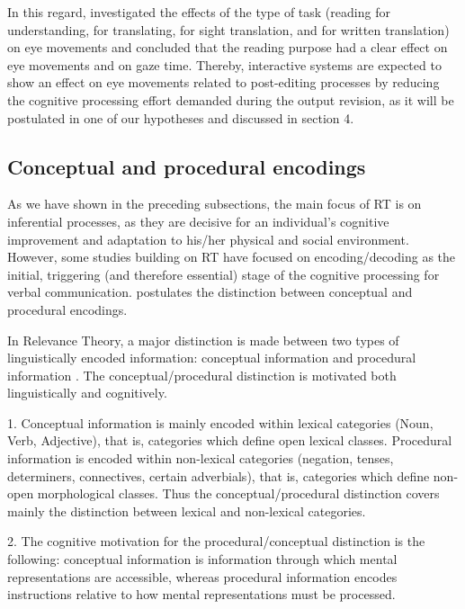 \documentclass[output=paper]{langsci/langscibook}
\begin{document}
In this regard, \citet{jakobsen2008} investigated the effects of the type of task (reading for understanding, for translating, for sight translation, and for written translation) on eye movements and concluded that the reading purpose had a clear effect on eye movements and on gaze time. Thereby, interactive systems are expected to show an effect on eye movements related to post-editing processes by reducing the cognitive processing effort demanded during the output revision, as it will be postulated in one of our hypotheses and discussed in section 4.


\subsection{Conceptual and procedural encodings}

As we have shown in the preceding subsections, the main focus of RT is on inferential processes, as they are decisive for an individual’s cognitive improvement and adaptation to his/her physical and social environment. However, some studies building on RT \citep[\textit{e.g. }][]{moeschler1998, blakemore2002, Wilson2011, alves2003, alves2013} have focused on encoding/decoding as the initial, triggering (and therefore essential) stage of the cognitive processing for verbal communication. \citet{moeschler1998} postulates the distinction between conceptual and procedural encodings.


In Relevance Theory, a major distinction is made between two types of linguistically encoded information: conceptual information and procedural information \citep{wilson1993}. The conceptual/procedural distinction is motivated both linguistically and cognitively.



1. Conceptual information is mainly encoded within lexical categories (Noun, Verb, Adjective), that is, categories which define open lexical classes. Procedural information is encoded within non-lexical categories (negation, tenses, determiners, connectives, certain adverbials), that is, categories which define non-open morphological classes. Thus the conceptual/procedural distinction covers mainly the distinction between lexical and non-lexical categories.



2. The cognitive motivation for the procedural/conceptual distinction is the following: conceptual information is information through which mental representations are accessible, whereas procedural information encodes instructions relative to how mental representations must be processed. \citep[p. 1]{moeschler1998}
\end{document}
